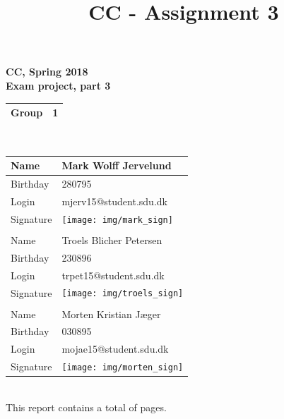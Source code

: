 \documentclass{article}
\date{}
\title{CC - Assignment 3}
\begin{document}
\newpage
{%
\centering
    \huge
    \bfseries
    \vspace{5mm}
CC, Spring 2018\\
Exam project, part 3\\
\vspace{5mm}
\begin{tabular}{|l|l|}
\hline
Group & 1 \\ \hline
\end{tabular}
\\
\vspace{10mm}
\begin{tabular}{@{}ll@{}}
\toprule
\multicolumn{1}{|l|}{Name}      & \multicolumn{1}{l|}{Mark Wolff Jervelund } \\ \midrule
\multicolumn{1}{|l|}{Birthday}  & \multicolumn{1}{l|}{280795} \\ \midrule
\multicolumn{1}{|l|}{Login}     & \multicolumn{1}{l|}{mjerv15@student.sdu.dk} \\ \midrule
\multicolumn{1}{|l|}{Signature} & \multicolumn{1}{l|}{\texttt{[image: img/mark\_sign]}} \\ \midrule
                                &                       \\ \midrule
\multicolumn{1}{|l|}{Name}      &  \multicolumn{1}{l|}{Troels Blicher Petersen} \\ \midrule
\multicolumn{1}{|l|}{Birthday}      &   \multicolumn{1}{l|}{230896} \\ \midrule
\multicolumn{1}{|l|}{Login}      &  \multicolumn{1}{l|}{trpet15@student.sdu.dk} \\ \midrule
\multicolumn{1}{|l|}{Signature}      & \multicolumn{1}{l|}{\texttt{[image: img/troels\_sign]} } \\ \midrule
                                &                       \\ \midrule
\multicolumn{1}{|l|}{Name}     &  \multicolumn{1}{l|}{Morten Kristian Jæger} \\ \midrule
\multicolumn{1}{|l|}{Birthday}      &  \multicolumn{1}{l|}{030895} \\ \midrule
\multicolumn{1}{|l|}{Login}     &   \multicolumn{1}{l|}{mojae15@student.sdu.dk} \\ \midrule
\multicolumn{1}{|l|}{Signature}    &  \multicolumn{1}{l|}{\texttt{[image: img/morten\_sign]}} \\ \midrule
\end{tabular}
\\
\vspace{10mm}
This report contains a total of \underline{ \pageref{LastPage} } pages.
}
\end{document}
